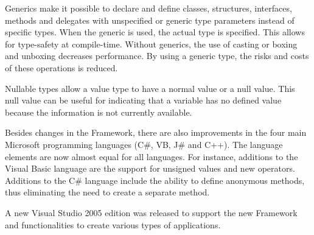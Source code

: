 Generics make it possible to declare and define classes, structures, interfaces, methods and delegates with unspecified or generic type parameters instead of specific types.
When the generic is used, the actual type is specified.
This allows for type-safety at compile-time.
Without generics, the use of casting or boxing and unboxing decreases performance.
By using a generic type, the risks and costs of these operations is reduced.

Nullable types allow a value type to have a normal value or a null value.
This null value can be useful for indicating that a variable has no defined value because the information is not currently available.

Besides changes in the Framework, there are also improvements in the four main Microsoft \dotNET programming languages (C\#, VB\dotNET, J\# and C++).
The language elements are now almost equal for all languages.
For instance, additions to the Visual Basic language are the support for unsigned values and new operators. Additions to the C\# language include the ability to define anonymous methods, thus eliminating the need to create a separate method.

A new Visual Studio 2005 edition was released to support the new Framework and functionalities to create various types of applications.
